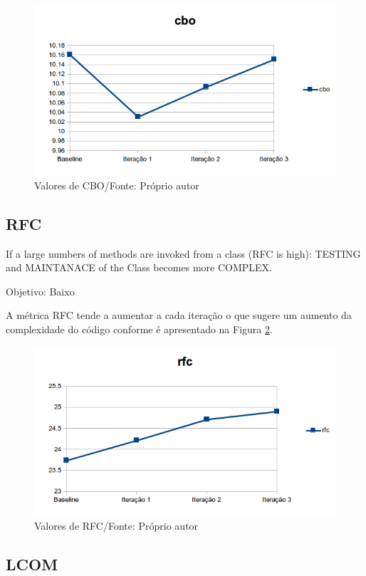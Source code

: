 \begin{figure}[h]
	\centering
	\includegraphics{img/cbo.png}
	\caption{Valores de CBO/Fonte: Próprio autor}
	\label{fig:cbo}
\end{figure}


\subsection{RFC}

If a large numbers of methods are invoked from a class (RFC is high):
TESTING and MAINTANACE of the Class becomes more COMPLEX.

Objetivo: Baixo


A métrica RFC tende a aumentar a cada iteração o que sugere um aumento da
complexidade do código conforme é apresentado na Figura \ref{fig:rfc}.

\begin{figure}[h]
	\centering
	\includegraphics{img/rfc.png}
	\caption{Valores de RFC/Fonte: Próprio autor}
	\label{fig:rfc}
\end{figure}

\subsection{LCOM}


